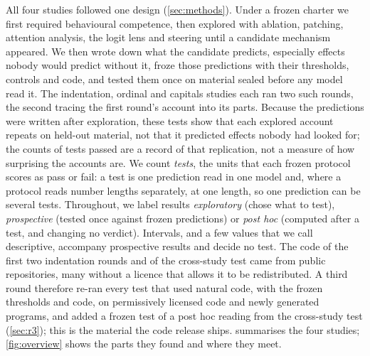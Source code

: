 \documentclass[11pt]{article}
\begin{document}
All four studies followed one design (\cref{sec:methods}). Under a frozen charter we first required behavioural competence, then explored with ablation, patching, attention analysis, the logit lens and steering until a candidate mechanism appeared. We then wrote down what the candidate predicts, especially effects nobody would predict without it, froze those predictions with their thresholds, controls and code, and tested them once on material sealed before any model read it. The indentation, ordinal and capitals studies each ran two such rounds, the second tracing the first round's account into its parts. Because the predictions were written after exploration, these tests show that each explored account repeats on held-out material, not that it predicted effects nobody had looked for; the counts of tests passed are a record of that replication, not a measure of how surprising the accounts are. We count \emph{tests}, the units that each frozen protocol scores as pass or fail: a test is one prediction read in one model and, where a protocol reads number lengths separately, at one length, so one prediction can be several tests. Throughout, we label results \emph{exploratory} (chose what to test), \emph{prospective} (tested once against frozen predictions) or \emph{post hoc} (computed after a test, and changing no verdict). Intervals, and a few values that we call descriptive, accompany prospective results and decide no test. The code of the first two indentation rounds and of the cross-study test came from public repositories, many without a licence that allows it to be redistributed. A third round therefore re-ran every test that used natural code, with the frozen thresholds and code, on permissively licensed code and newly generated programs, and added a frozen test of a post hoc reading from the cross-study test (\cref{sec:r3}); this is the material the code release ships.  summarises the four studies; \cref{fig:overview} shows the parts they found and where they meet.
\end{document}
